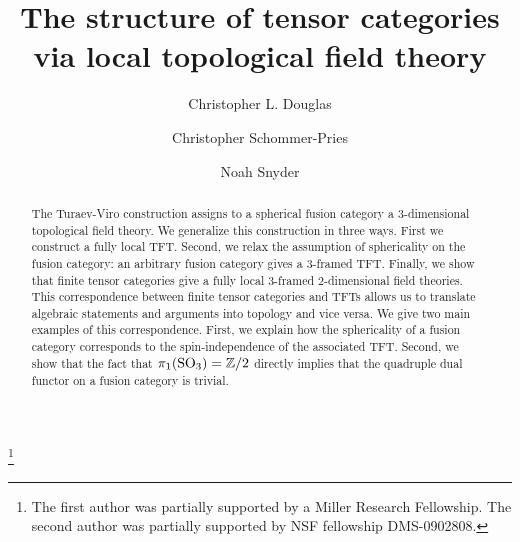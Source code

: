 \documentclass{amsart}
\begin{document}
\title{The structure of tensor categories via local topological field theory}

\begin{abstract}
The Turaev-Viro construction assigns to a spherical fusion category a 3-dimensional topological field theory.  We generalize this construction in three ways. First we construct a fully local TFT.  Second, we relax the assumption of sphericality on the fusion category: an arbitrary fusion category gives a $3$-framed TFT.  Finally, we show that finite tensor categories give a fully local $3$-framed $2$-dimensional field theories.  This correspondence between finite tensor categories and TFTs allows us to translate algebraic statements and arguments into topology and vice versa.  We give two main examples of this correspondence.  First, we explain how the sphericality of a fusion category corresponds to the spin-independence of the associated TFT.  Second, we show that the fact that $\pi_1(\mathrm{SO}_3) = \mathbb Z/2$ directly implies that the quadruple dual functor on a fusion category is trivial.
\end{abstract}
	
\author{Christopher L. Douglas}
\address{Mathematical Institute\\ University of Oxford\\ Oxford OX1 3LB\\ United Kingdom}
      	
\author{Christopher Schommer-Pries}
\address{Department of Mathematics\\ Massachusetts Institute of Technology\\ Cambridge, MA 02139\\ USA}

\author{Noah Snyder}
\address{Department of Mathematics\\ Columbia University\\ New York, NY 10027\\ USA}

\thanks{The first author was partially supported by a Miller Research Fellowship.  The second author was partially supported by NSF fellowship DMS-0902808.}


\maketitle	
\setcounter{tocdepth}{3}
\tableofcontents
\end{document}
